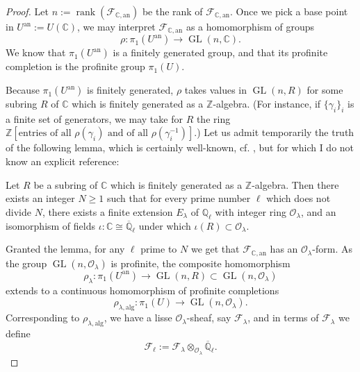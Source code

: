 \begin{proof}
Let \(n:=\operatorname{rank}(\mathcal{F}_{\mathbb{C},\mathrm{an}})\) be the
rank of \(\mathcal{F}_{\mathbb{C},\mathrm{an}}\). Once we pick a base point in
\(U^{\mathrm{an}}:=U(\mathbb{C})\), we may interpret
\(\mathcal{F}_{\mathbb{C},\mathrm{an}}\) as a homomorphism of groups
\[
  \rho:\pi_1(U^{\mathrm{an}})\to\operatorname{GL}(n,\mathbb{C}).
\]
We know that \(\pi_1(U^{\mathrm{an}})\) is a finitely generated group, and
that its profinite completion is the profinite group \(\pi_1(U)\).

Because \(\pi_1(U^{\mathrm{an}})\) is finitely generated, \(\rho\) takes values
in \(\operatorname{GL}(n,R)\) for some subring \(R\) of \(\mathbb{C}\) which
is finitely generated as a \(\mathbb{Z}\)-algebra. (For instance, if
\(\{\gamma_i\}_i\) is a finite set of generators, we may take for \(R\) the
ring \(\mathbb{Z}[\text{entries of all }\rho(\gamma_i)\text{ and of all }
\rho(\gamma_i^{-1})]\).) Let us admit temporarily the truth of the following
lemma, which is certainly well-known, cf. \cite[6.1.2 (A'')]{BBD}, but for
which I do not know an explicit reference:

Let \(R\) be a subring of \(\mathbb{C}\) which is finitely generated as a
\(\mathbb{Z}\)-algebra. Then there exists an integer \(N\geq 1\) such that for
every prime number \(\ell\) which does not divide \(N\), there exists a finite
extension \(E_\lambda\) of \(\mathbb{Q}_\ell\) with integer ring
\(\mathcal{O}_\lambda\), and an isomorphism of fields
\(\iota:\mathbb{C}\cong\overline{\mathbb{Q}}_\ell\) under which
\(\iota(R)\subset\mathcal{O}_\lambda\).

Granted the lemma, for any \(\ell\) prime to \(N\) we get that
\(\mathcal{F}_{\mathbb{C},\mathrm{an}}\) has an
\(\mathcal{O}_\lambda\)-form. As the group
\(\operatorname{GL}(n,\mathcal{O}_\lambda)\) is profinite, the composite
homomorphism
\[
  \rho_\lambda:\pi_1(U^{\mathrm{an}})\to
  \operatorname{GL}(n,R)\subset\operatorname{GL}(n,\mathcal{O}_\lambda)
\]
extends to a continuous homomorphism of profinite completions
\[
  \rho_{\lambda,\mathrm{alg}}:\pi_1(U)\to
  \operatorname{GL}(n,\mathcal{O}_\lambda).
\]
Corresponding to \(\rho_{\lambda,\mathrm{alg}}\), we have a lisse
\(\mathcal{O}_\lambda\)-sheaf, say \(\mathcal{F}_\lambda\), and in terms of
\(\mathcal{F}_\lambda\) we define
\[
  \mathcal{F}_\ell:=\mathcal{F}_\lambda
  \otimes_{\mathcal{O}_\lambda}\overline{\mathbb{Q}}_\ell.
\]
\end{proof}

